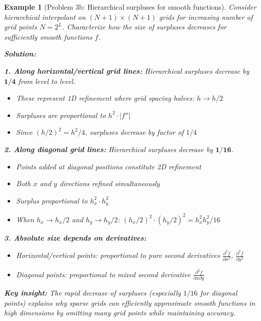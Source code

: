 \documentclass[11pt,a4paper]{article}
\newtheorem{example}[theorem]{Example}
\begin{document}
\begin{example}[Problem 3b: Hierarchical surpluses for smooth functions]
   Consider hierarchical interpolant on $(N+1) \times (N+1)$ grids for increasing number of grid points $N = 2^L$. Characterize how the size of surpluses decreases for sufficiently smooth functions $f$.
   
   \textbf{Solution:}
   
   \textbf{1. Along horizontal/vertical grid lines:} Hierarchical surpluses decrease by $\mathbf{1/4}$ from level to level.
   \begin{itemize}
       \item These represent 1D refinement where grid spacing halves: $h \to h/2$
       \item Surpluses are proportional to $h^2 \cdot |f''|$
       \item Since $(h/2)^2 = h^2/4$, surpluses decrease by factor of $1/4$
   \end{itemize}
   
   \textbf{2. Along diagonal grid lines:} Hierarchical surpluses decrease by $\mathbf{1/16}$.
   \begin{itemize}
       \item Points added at diagonal positions constitute 2D refinement
       \item Both $x$ and $y$ directions refined simultaneously
       \item Surplus proportional to $h_x^2 \cdot h_y^2$
       \item When $h_x \to h_x/2$ and $h_y \to h_y/2$: $(h_x/2)^2 \cdot (h_y/2)^2 = h_x^2 h_y^2/16$
   \end{itemize}
   
   \textbf{3. Absolute size depends on derivatives:}
   \begin{itemize}
       \item Horizontal/vertical points: proportional to pure second derivatives $\frac{\partial^2 f}{\partial x^2}$, $\frac{\partial^2 f}{\partial y^2}$
       \item Diagonal points: proportional to mixed second derivative $\frac{\partial^2 f}{\partial x \partial y}$
   \end{itemize}
   
   \textbf{Key insight:} The rapid decrease of surpluses (especially $1/16$ for diagonal points) explains why sparse grids can efficiently approximate smooth functions in high dimensions by omitting many grid points while maintaining accuracy.
\end{example}
\end{document}
